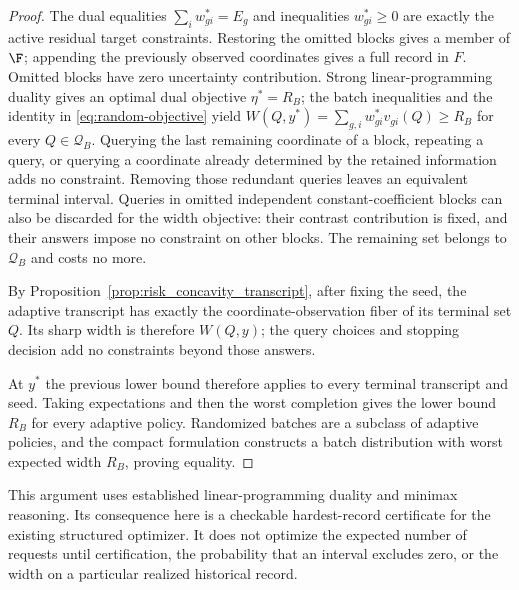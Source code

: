 \begin{proof}
The dual equalities $\sum_i w^*_{gi}=E_g$ and inequalities $w^*_{gi}\geq0$
are exactly the active residual target constraints. Restoring the omitted
blocks gives a member of $\F$; appending the previously observed coordinates
gives a full record in $F$. Omitted blocks have zero uncertainty contribution.
Strong linear-programming
duality gives an optimal dual objective $\eta^*=R_B$; the batch inequalities
and the identity in \eqref{eq:random-objective} yield
$W(Q,y^*)=\sum_{g,i}w^*_{gi}v_{gi}(Q)\geq R_B$ for every $Q\in\mathcal Q_B$.
Querying the last remaining coordinate of a block, repeating a query, or
querying a coordinate already determined by the retained information adds
no constraint. Removing those redundant queries leaves an equivalent
terminal interval. Queries in omitted independent constant-coefficient
blocks can also be discarded for the width objective: their contrast
contribution is fixed, and their answers impose no constraint on other
blocks. The remaining set belongs to $\mathcal Q_B$ and costs no more.

By Proposition~\ref{prop:risk_concavity_transcript}, after fixing the seed,
the adaptive transcript has exactly the coordinate-observation fiber of
its terminal set $Q$. Its sharp width is therefore $W(Q,y)$; the query
choices and stopping decision add no constraints beyond those answers.

At $y^*$ the previous lower bound therefore applies to every terminal
transcript and seed. Taking expectations and then the worst completion
gives the lower bound $R_B$ for every adaptive policy. Randomized batches
are a subclass of adaptive policies, and the compact formulation constructs
a batch distribution with worst expected width $R_B$, proving equality.
\end{proof}

This argument uses established linear-programming duality and minimax
reasoning. Its consequence here is a checkable hardest-record certificate
for the existing structured optimizer. It does not optimize the expected
number of requests until certification, the probability that an interval
excludes zero, or the width on a particular realized historical record.

